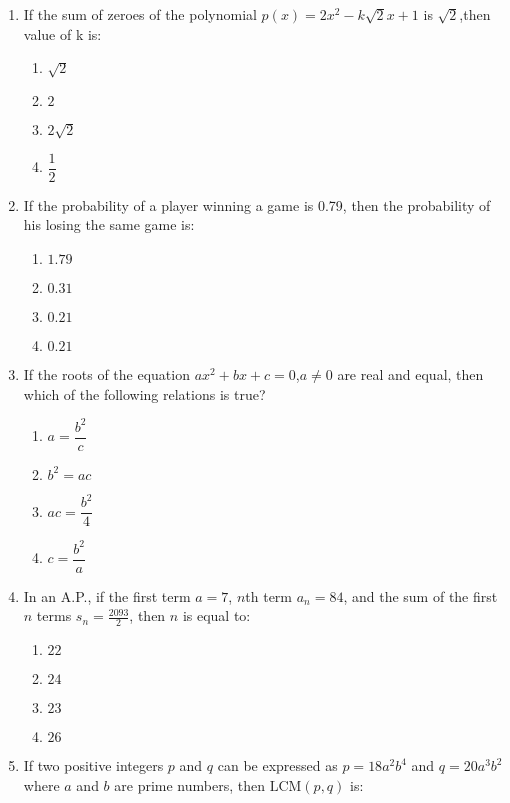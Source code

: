 \documentclass[12pt,-letter paper]{article}
\providecommand{\brak}[1]{\ensuremath{\left(#1\right)}}
\providecommand{\brak}[1]{\ensuremath{\left(#1\right)}}
\begin{document}
\begin{enumerate}

\item If the sum of zeroes of the polynomial $ p\brak x = 2x^2 - k\sqrt2x+1 $ is ${\sqrt2} $,then value of k is:
\begin{enumerate}
    \item $ \sqrt{2} $
    \item $2$
    \item $ 2  \sqrt{2} $
    \item $ \dfrac{1}{2} $
 \end{enumerate}

\item If the probability of a player winning a game is 0.79, then the probability of his losing the same game is:
\begin{enumerate}    
    \item $1.79$
    \item $0.31$
    \item $0.21	$                                                                                     \item $0.21$
\end{enumerate}
\item If the roots of the equation $ax^2 + bx + c = 0$,$a \neq 0$ are real and equal, then which of the following relations is true?
\begin{enumerate}    
    \item $a = \dfrac{b^2}{c}$
    \item $b^2 = ac$                                                                                    \item $ac = \dfrac{b^2}{4}$
    \item $c = \dfrac{b^2}{a}$
\end{enumerate}
\item In an A.P., if the first term $a = 7$, $n$th term $a_{n} = 84$, and the sum of the first $n$ terms $s_{n} = \frac{2093}{2}$, then $n$ is equal to:
\begin{enumerate}
    \item $22$
    \item $24$
    \item $23$
    \item $26$
\end{enumerate}
\newpage
\item If two positive integers $p$ and $q$ can be expressed as $p = 18a^2 b^4$ and $q = 20a^3 b^2$ where $a$ and $b$ are prime numbers, then $\text{LCM}(p, q)$ is:

\end{enumerate}
\end{document}
